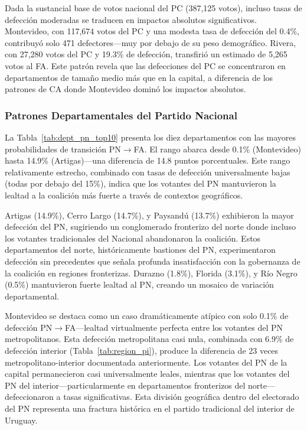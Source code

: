 Dada la sustancial base de votos nacional del PC (387,125 votos), incluso tasas de defección moderadas se traducen en impactos absolutos significativos. Montevideo, con 117,674 votos del PC y una modesta tasa de defección del 0.4\%, contribuyó solo 471 defectores---muy por debajo de su peso demográfico. Rivera, con 27,280 votos del PC y 19.3\% de defección, transfirió un estimado de 5,265 votos al FA. Este patrón revela que las defecciones del PC se concentraron en departamentos de tamaño medio más que en la capital, a diferencia de los patrones de CA donde Montevideo dominó los impactos absolutos.

\subsubsection{Patrones Departamentales del Partido Nacional}

La Tabla~\ref{tab:dept_pn_top10} presenta los diez departamentos con las mayores probabilidades de transición PN$\to$FA. El rango abarca desde 0.1\% (Montevideo) hasta 14.9\% (Artigas)---una diferencia de 14.8 puntos porcentuales. Este rango relativamente estrecho, combinado con tasas de defección universalmente bajas (todas por debajo del 15\%), indica que los votantes del PN mantuvieron la lealtad a la coalición más fuerte a través de contextos geográficos.



Artigas (14.9\%), Cerro Largo (14.7\%), y Paysandú (13.7\%) exhibieron la mayor defección del PN, sugiriendo un conglomerado fronterizo del norte donde incluso los votantes tradicionales del Nacional abandonaron la coalición. Estos departamentos del norte, históricamente bastiones del PN, experimentaron defección sin precedentes que señala profunda insatisfacción con la gobernanza de la coalición en regiones fronterizas. Durazno (1.8\%), Florida (3.1\%), y Río Negro (0.5\%) mantuvieron fuerte lealtad al PN, creando un mosaico de variación departamental.

Montevideo se destaca como un caso dramáticamente atípico con solo 0.1\% de defección PN$\to$FA---lealtad virtualmente perfecta entre los votantes del PN metropolitanos. Esta defección metropolitana casi nula, combinada con 6.9\% de defección interior (Tabla~\ref{tab:region_pi}), produce la diferencia de 23 veces metropolitano-interior documentada anteriormente. Los votantes del PN de la capital permanecieron casi universalmente leales, mientras que los votantes del PN del interior---particularmente en departamentos fronterizos del norte---defeccionaron a tasas significativas. Esta división geográfica dentro del electorado del PN representa una fractura histórica en el partido tradicional del interior de Uruguay.

